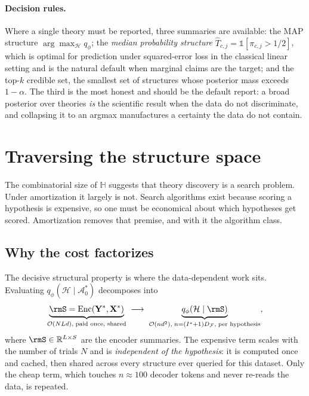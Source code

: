 \documentclass[11pt]{article}
\newcommand{\rmX}{\mathbf{X}}
\newcommand{\rmY}{\mathbf{Y}}
\begin{document}
\paragraph{Decision rules.} Where a single theory must be reported, three summaries are
available: the MAP structure $\arg\max_\mathcal{H} q_\phi$; the \emph{median probability
structure} $\hat{T}_{c,j} = \mathbb{1}[\pi_{c,j} > 1/2]$, which is optimal for
prediction under squared-error loss in the classical linear setting and is the natural
default when marginal claims are the target; and the top-$k$ credible set, the smallest
set of structures whose posterior mass exceeds $1-\alpha$. The third is the most honest
and should be the default report: a broad posterior over theories \emph{is} the
scientific result when the data do not discriminate, and collapsing it to an argmax
manufactures a certainty the data do not contain.

\section{Traversing the structure space}
\label{sec:td-search}

The combinatorial size of $\mathbb{H}$ suggests that theory discovery is a search
problem. Under amortization it largely is not. Search algorithms exist because scoring a
hypothesis is expensive, so one must be economical about which hypotheses get scored.
Amortization removes that premise, and with it the algorithm class.

\subsection{Why the cost factorizes}

The decisive structural property is where the data-dependent work sits. Evaluating
$q_\phi(\mathcal{H} \mid \mathcal{A}_0^\ast)$ decomposes into
%
\begin{equation}
\label{eq:td-factorization}
\underbrace{\rmS = \mathrm{Enc}(\rmY^\ast, \rmX^\ast)}_{\mathcal{O}(N L d),\;\text{paid once, shared}}
\;\longrightarrow\;
\underbrace{q_\phi(\mathcal{H} \mid \rmS)}_{\mathcal{O}(n d^2),\; n = (I^\ast+1)D_\mathcal{F},\;\text{per hypothesis}} ,
\end{equation}
%
where $\rmS \in \mathbb{R}^{L \times S}$ are the encoder summaries. The expensive term
scales with the number of trials $N$ and is \emph{independent of the hypothesis}: it is
computed once and cached, then shared across every structure ever queried for this
dataset. Only the cheap term, which touches $n \approx 100$ decoder tokens and never
re-reads the data, is repeated.
\end{document}
